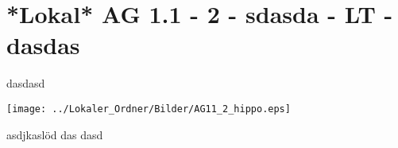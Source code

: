 \section{*Lokal* AG 1.1 - 2 - sdasda - LT - dasdas}

\begin{beispiel}[AG 1.1]{1}
dasdasd

\texttt{[image: ../Lokaler\_Ordner/Bilder/AG11\_2\_hippo.eps]}

asdjkaslöd
das
dasd

\end{beispiel}